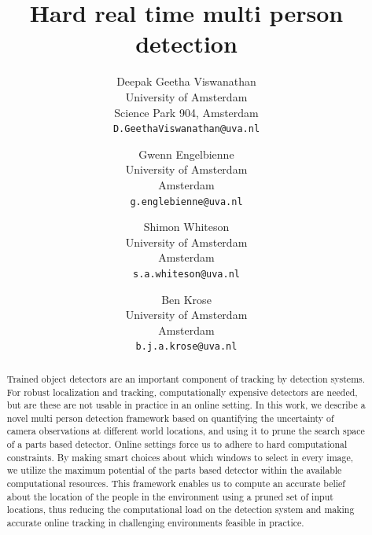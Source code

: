 \documentclass[10pt,twocolumn,letterpaper]{article}
\begin{document}
\title{Hard real time multi person detection}

\author{Deepak Geetha Viswanathan\\
University of Amsterdam\\
Science Park 904, Amsterdam\\
{\tt\small D.GeethaViswanathan@uva.nl}
\and
Gwenn Engelbienne\\
University of Amsterdam\\
Amsterdam\\
{\tt\small g.englebienne@uva.nl}
\and
Shimon Whiteson\\
University of Amsterdam\\
Amsterdam\\
{\tt\small s.a.whiteson@uva.nl}
\and
Ben Krose\\
University of Amsterdam\\
Amsterdam\\
{\tt\small b.j.a.krose@uva.nl}
}

\maketitle


\begin{abstract}
Trained object detectors are an important component of tracking by detection systems. For robust localization and tracking, computationally expensive detectors are needed, but are these are not usable in practice in an online setting.  In this work, we describe a novel multi person detection framework based on quantifying the uncertainty of camera observations at different world locations, and using it to prune the search space of a parts based detector. Online settings force us to adhere to hard computational constraints. By making smart choices about which windows to select in every image, we utilize the maximum potential of the parts based detector within the available computational resources. 
 This framework enables us to compute an accurate belief about the location of the people in the environment using a pruned set of input locations, thus reducing the computational load on the detection system and making accurate online tracking in challenging environments feasible in practice.
\end{abstract}
\end{document}
